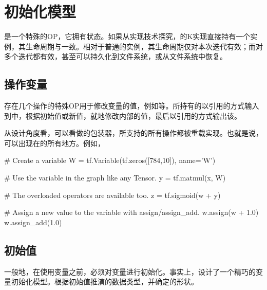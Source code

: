 \section{初始化模型}

\begin{content}

是一个特殊的OP，它拥有状态。如果从实现技术探究，的K实现直接持有一个实例，其生命周期与一致。相对于普通的实例，其生命周期仅对本次迭代有效；而对多个迭代都有效，甚至可以持久化到文件系统，或从文件系统中恢复。

\subsection{操作变量}

存在几个操作的特殊OP用于修改变量的值，例如等。所持有的以引用的方式输入到中，根据初始值或新值，就地修改内部的值，最后以引用的方式输出该。

从设计角度看，可以看做的包装器，所支持的所有操作都被重载实现。也就是说，可以出现在的所有地方。例如，

\begin{leftbar}
\begin{python}
# Create a variable
W = tf.Variable(tf.zeros([784,10]), name='W')

# Use the variable in the graph like any Tensor.
y = tf.matmul(x, W)

# The overloaded operators are available too.
z = tf.sigmoid(w + y)

# Assign a new value to the variable with assign/assign\_add.
w.assign(w + 1.0)
w.assign_add(1.0)
\end{python}
\end{leftbar}

\subsection{初始值}

一般地，在使用变量之前，必须对变量进行初始化。事实上，设计了一个精巧的变量初始化模型。根据初始值推演的数据类型，并确定的形状。


\end{content}
